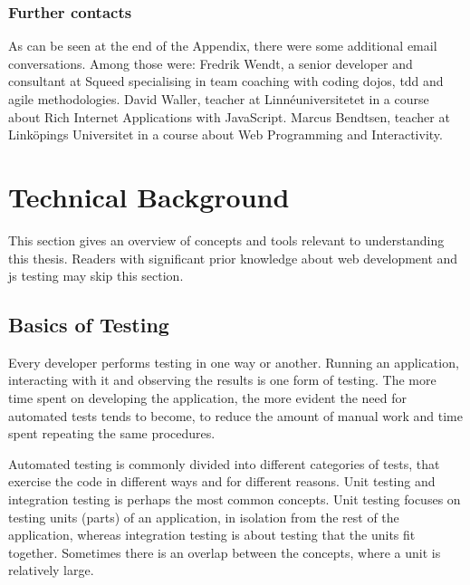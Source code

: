 \documentclass[11pt]{article}
\begin{document}
\subsubsection{Further contacts}

As can be seen at the end of the Appendix, there were some additional email conversations. Among those were: Fredrik Wendt, a senior developer and consultant at Squeed specialising in team coaching with coding dojos, \gls{tdd} and agile methodologies. David Waller, teacher at Linnéuniversitetet in a course about Rich Internet Applications with JavaScript. Marcus Bendtsen, teacher at Linköpings Universitet in a course about Web Programming and Interactivity.


\section{Technical Background}
\label{sec:technicalbackground}

This section gives an overview of concepts and tools relevant to understanding this thesis. Readers with significant prior knowledge about web development and \gls{js} testing may skip this section.

\subsection{Basics of Testing}
\label{subsec:testingbasics}

Every developer performs testing in one way or another. Running an application, interacting with it and observing the results is one form of testing. The more time spent on developing the application, the more evident the need for automated tests tends to become, to reduce the amount of manual work and time spent repeating the same procedures.

Automated testing is commonly divided into different categories of tests, that exercise the code in different ways and for different reasons. Unit testing and integration testing is perhaps the most common concepts. Unit testing focuses on testing units (parts) of an application, in isolation from the rest of the application, whereas integration testing is about testing that the units fit together. Sometimes there is an overlap between the concepts, where a unit is relatively large.
\end{document}
